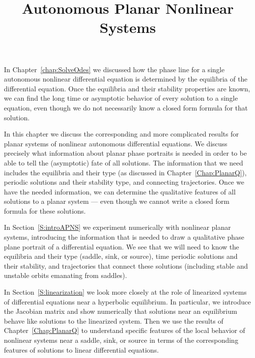 \documentclass{ximera}
\title{Autonomous Planar Nonlinear Systems}
\begin{document}
\begin{abstract}
\end{abstract}
\maketitle


\label{C:NPS}

\normalsize

In Chapter~\ref{chap:SolveOdes} we discussed how the phase line for a single
autonomous nonlinear differential equation is determined by the equilibria of 
the differential equation.  Once the equilibria and their stability properties
are known, we can find the long time or asymptotic behavior of every solution 
to a single equation, even though we do not necessarily know a closed form 
formula for that solution.  

In this chapter we discuss the corresponding and more complicated results for 
planar systems of nonlinear autonomous differential equations.  We discuss 
precisely what information about planar phase portraits is needed in order to 
be able to tell the (asymptotic) fate of all solutions.  The information that 
we need includes the equilibria and their type (as discussed in 
Chapter~\ref{Chap:PlanarQ}), periodic solutions and their stability type, and
connecting trajectories.  Once we have the needed information, we can 
determine the qualitative features of all solutions to a planar system --- 
even though we cannot write a closed form formula for these solutions.  

In Section~\ref{S:introAPNS} we experiment numerically with nonlinear planar 
systems, introducing the information that is needed to draw a qualitative 
phase plane portrait of a differential equation.  We see that we will need to 
know the equilibria and their type (saddle, sink, or source), time periodic 
solutions and their stability, and trajectories that connect these solutions 
(including stable and unstable orbits emanating from saddles).  

In Section~\ref{S:linearization} we look more closely at the role of
linearized systems of differential equations near a hyperbolic equilibrium. 
In particular, we introduce the Jacobian matrix and show numerically that 
solutions near an equilibrium behave like solutions to the linearized 
system.  Then we use the results of Chapter~\ref{Chap:PlanarQ} to understand
specific features of the local behavior of nonlinear systems near a saddle,
sink, or source in terms of the corresponding features of solutions to linear 
differential equations.
\end{document}

